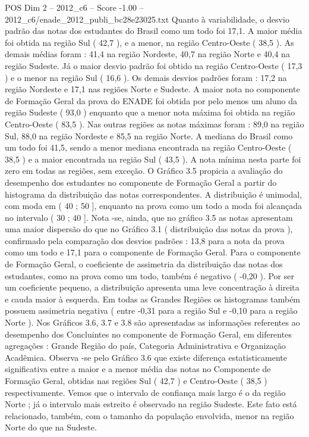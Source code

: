 \begin{textsample}{POS Dim 2 – 2012\_c6 – Score -1.00 – 2012\_c6/enade\_2012\_publi\_bc28e23025.txt}
Quanto à variabilidade, o desvio padrão das notas dos estudantes do Brasil como um todo foi 17,1.
A maior média foi obtida na região Sul ( 42,7 ), e a menor, na região Centro-Oeste ( 38,5 ).
As demais médias foram : 41,4 na região Nordeste, 40,7 na região Norte e 40,4 na região Sudeste.
Já o maior desvio padrão foi obtido na região Centro-Oeste ( 17,3 ) e o menor na região Sul ( 16,6 ).
Os demais desvios padrões foram : 17,2 na região Nordeste e 17,1 nas regiões Norte e Sudeste.
A maior nota no componente de Formação Geral da prova do ENADE foi obtida por pelo menos um aluno da região Sudeste ( 93,0 ) enquanto que a menor nota máxima foi obtida na região Centro-Oeste ( 83,5 ).
Nas outras regiões as notas máximas foram : 89,0 na região Sul, 88,0 na região Nordeste e 85,5 na região Norte.
A mediana do Brasil como um todo foi 41,5, sendo a menor mediana encontrada na região Centro-Oeste ( 38,5 ) e a maior encontrada na região Sul ( 43,5 ).
A nota mínima nesta parte foi zero em todas as regiões, sem exceção.
O Gráfico 3.5 propicia a avaliação do desempenho dos estudantes no componente de Formação Geral a partir do histograma da distribuição das notas correspondentes.
A distribuição é unimodal, com moda em ( 40 ; 50 ], enquanto na prova como um todo a moda foi alcançada no intervalo ( 30 ; 40 ].
Nota -se, ainda, que no gráfico 3.5 as notas apresentam uma maior dispersão do que no Gráfico 3.1 ( distribuição das notas da prova ), confirmado pela comparação dos desvios padrões : 13,8 para a nota da prova como um todo e 17,1 para o componente de Formação Geral.
Para o componente de Formação Geral, o coeficiente de assimetria da distribuição das notas dos estudantes, como na prova como um todo, também é negativo ( -0,20 ).
Por ser um coeficiente pequeno, a distribuição apresenta uma leve concentração à direita e cauda maior à esquerda.
Em todas as Grandes Regiões os histogramas também possuem assimetria negativa ( entre -0,31 para a região Sul e -0,10 para a região Norte ).
Nos Gráficos 3.6, 3.7 e 3.8 são apresentadas as informações referentes ao desempenho dos Concluintes no componente de Formação Geral, em diferentes agregações : Grande Região do país, Categoria Administrativa e Organização Acadêmica.
Observa -se pelo Gráfico 3.6 que existe diferença estatisticamente significativa entre a maior e a menor média das notas no Componente de Formação Geral, obtidas nas regiões Sul ( 42,7 ) e Centro-Oeste ( 38,5 ) respectivamente.
Vemos que o intervalo de confiança mais largo é o da região Norte ; já o intervalo mais estreito é observado na região Sudeste.
Este fato está relacionado, também, com o tamanho da população envolvida, menor na região Norte do que na Sudeste.

\end{textsample}
